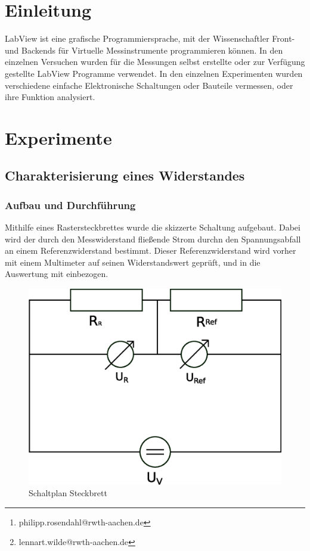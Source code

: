 \documentclass[12pt,twoside,a4paper]{scrartcl}
\author{Philipp Rosendahl Mat.-Nr: 378092\thanks{philipp.rosendahl@rwth-aachen.de}
		\and Lennart Wilde, Mat.-Nr: 381588\thanks{lennart.wilde@rwth-aachen.de}}
\begin{document}
\maketitle
\newpage

\tableofcontents
\newpage


\section{Einleitung}
  LabView ist eine grafische Programmiersprache, mit der Wissenschaftler Front- und Backends für Virtuelle Messinstrumente programmieren können.
	In den einzelnen Versuchen wurden für die Messungen selbst erstellte oder zur Verfügung gestellte LabView Programme verwendet. In den einzelnen Experimenten wurden verschiedene einfache Elektronische Schaltungen oder Bauteile vermessen, oder ihre Funktion analysiert.

	\section{Experimente}
		\subsection{Charakterisierung eines Widerstandes}

			\subsubsection{Aufbau und Durchführung}
				Mithilfe eines Rastersteckbrettes wurde die skizzerte Schaltung aufgebaut. Dabei wird der durch den Messwiderstand fließende Strom durchn den Spannungsabfall an einem Referenzwiderstand bestimmt. Dieser Referenzwiderstand wird vorher mit einem Multimeter auf seinen Widerstandswert geprüft, und in die Auswertung mit einbezogen.

				\begin{figure}[H]
					\centering

					\includegraphics[width = 0.8 \textwidth]{Pictures/resistance}

					\caption{Schaltplan Steckbrett}
				\end{figure}
\end{document}
